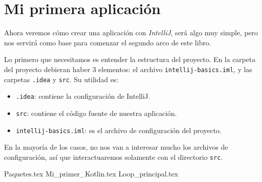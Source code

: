 \section{Mi primera aplicación}
  Ahora veremos cómo crear una aplicación con \textit{IntelliJ}, será algo muy simple, pero nos
  servirá como base para comenzar el segundo arco de este libro.

  Lo primero que necesitamos es entender la estructura del proyecto.
  En la carpeta del proyecto debieran haber 3 elementos: el archivo \texttt{intellij-basics.iml}, y 
  las carpetas \texttt{.idea} y \texttt{src}.
  Su utilidad es:
  \begin{itemize}
    \item \texttt{.idea}: contiene la configuración de IntelliJ.
    \item \texttt{src}: contiene el código fuente de nuestra aplicación.
    \item \texttt{intellij-basics.iml}: es el archivo de configuración del proyecto.
  \end{itemize}

  En la mayoría de los casos, no nos van a interesar mucho los archivos de configuración, así que
  interactuaremos solamente con el directorio \texttt{src}.

  {Paquetes.tex}
  {Mi_primer_Kotlin.tex}
  {Loop_principal.tex}
